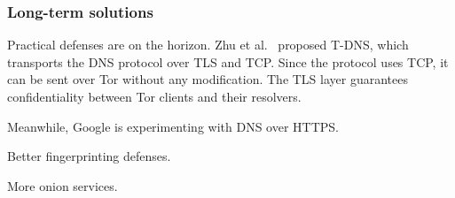\subsubsection{Long-term solutions}
\label{sec:long-term}
Practical defenses are on the horizon.  Zhu et al.~\cite{Zhu2015a} proposed
T-DNS, which transports the DNS protocol over TLS and TCP.  Since the protocol
uses TCP, it can be sent over Tor without any modification.  The TLS layer
guarantees confidentiality between Tor clients and their resolvers.

Meanwhile, Google is experimenting with DNS over HTTPS.

Better fingerprinting defenses.

More onion services.

